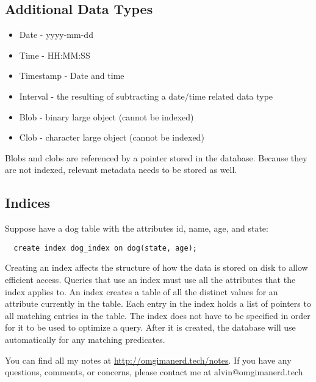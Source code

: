 \documentclass{math}
\begin{document}
\subsection*{Additional Data Types}
\begin{itemize}
  \item Date - yyyy-mm-dd
  \item Time - HH:MM:SS
  \item Timestamp - Date and time
  \item Interval - the resulting of subtracting a date/time related data type
  \item Blob - binary large object (cannot be indexed)
  \item Clob - character large object (cannot be indexed)
\end{itemize}
Blobs and clobs are referenced by a pointer stored in the database. Because
they are not indexed, relevant metadata needs to be stored as well.

\subsection*{Indices}
Suppose have a dog table with the attributes id, name, age, and state:
\begin{lstlisting}
  create index dog_index on dog(state, age);
\end{lstlisting}
Creating an index affects the structure of how the data is stored on disk to
allow efficient access. Queries that use an index must use all the
attributes that the index applies to. An index creates a table of all the
distinct values for an attribute currently in the table. Each entry in the
index holds a list of pointers to all matching entries in the table. The index
does not have to be specified in order for it to be used to optimize a query.
After it is created, the database will use automatically for any matching
predicates.

\begin{center}
  You can find all my notes at \url{http://omgimanerd.tech/notes}. If you have
  any questions, comments, or concerns, please contact me at
  alvin@omgimanerd.tech
\end{center}
\end{document}
